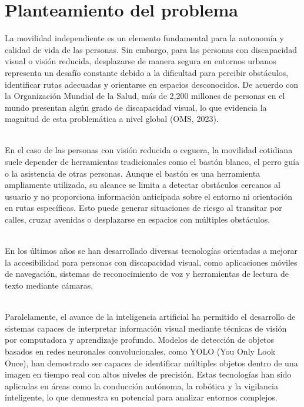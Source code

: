 \section{Planteamiento del problema}



La movilidad independiente es un elemento fundamental para la autonomía y calidad de vida de las personas. Sin embargo, para las personas con discapacidad visual o visión reducida, desplazarse de manera segura en entornos urbanos representa un desafío constante debido a la dificultad para percibir obstáculos, identificar rutas adecuadas y orientarse en espacios desconocidos. De acuerdo con la Organización Mundial de la Salud, más de 2,200 millones de personas en el mundo presentan algún grado de discapacidad visual, lo que evidencia la magnitud de esta problemática a nivel global (OMS, 2023). \cite{OMS_ceguera}

\\

En el caso de las personas con visión reducida o ceguera, la movilidad cotidiana suele depender de herramientas tradicionales como el bastón blanco, el perro guía o la asistencia de otras personas. Aunque el bastón es una herramienta ampliamente utilizada, su alcance se limita a detectar obstáculos cercanos al usuario y no proporciona información anticipada sobre el entorno ni orientación en rutas específicas. Esto puede generar situaciones de riesgo al transitar por calles, cruzar avenidas o desplazarse en espacios con múltiples obstáculos.

\\

En los últimos años se han desarrollado diversas tecnologías orientadas a mejorar la accesibilidad para personas con discapacidad visual, como aplicaciones móviles de navegación, sistemas de reconocimiento de voz y herramientas de lectura de texto mediante cámaras.

\\

Paralelamente, el avance de la inteligencia artificial ha permitido el desarrollo de sistemas capaces de interpretar información visual mediante técnicas de visión por computadora y aprendizaje profundo. Modelos de detección de objetos basados en redes neuronales convolucionales, como YOLO (You Only Look Once), han demostrado ser capaces de identificar múltiples objetos dentro de una imagen en tiempo real con altos niveles de precisión. Estas tecnologías han sido aplicadas en áreas como la conducción autónoma, la robótica y la vigilancia inteligente, lo que demuestra su potencial para analizar entornos complejos.

